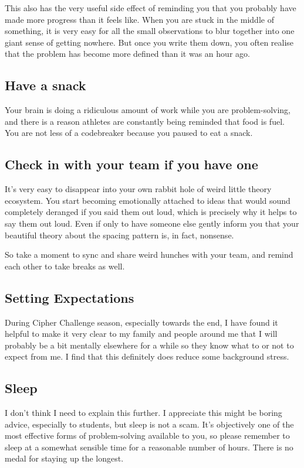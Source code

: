 This also has the very useful side effect of reminding you that you probably have made more progress than it feels like. When you are stuck in the middle of something, it is very easy for all the small observations to blur together into one giant sense of getting nowhere. But once you write them down, you often realise that the problem has become more defined than it was an hour ago.

\subsection{Have a snack}
Your brain is doing a ridiculous amount of work while you are problem-solving, and there is a reason athletes are constantly being reminded that food is fuel. You are not less of a codebreaker because you paused to eat a snack.

\subsection{Check in with your team if you have one}
It's very easy to disappear into your own rabbit hole of weird little theory ecosystem. You start becoming emotionally attached to ideas that would sound completely deranged if you said them out loud, which is precisely why it helps to say them out loud. Even if only to have someone else gently inform you that your beautiful theory about the spacing pattern is, in fact, nonsense. 

So take a moment to sync and share weird hunches with your team, and remind each other to take breaks as well.

\subsection{Setting Expectations}
During Cipher Challenge season, especially towards the end, I have found it helpful to make it very clear to my family and people around me that I will probably be a bit mentally elsewhere for a while so they know what to or not to expect from me. I find that this definitely does reduce some background stress. 

\subsection{Sleep}
I don't think I need to explain this further. I appreciate this might be boring advice, especially to students, but sleep is not a scam. It's objectively one of the most effective forms of problem-solving available to you, so please remember to sleep at a somewhat sensible time for a reasonable number of hours. There is no medal for staying up the longest.

